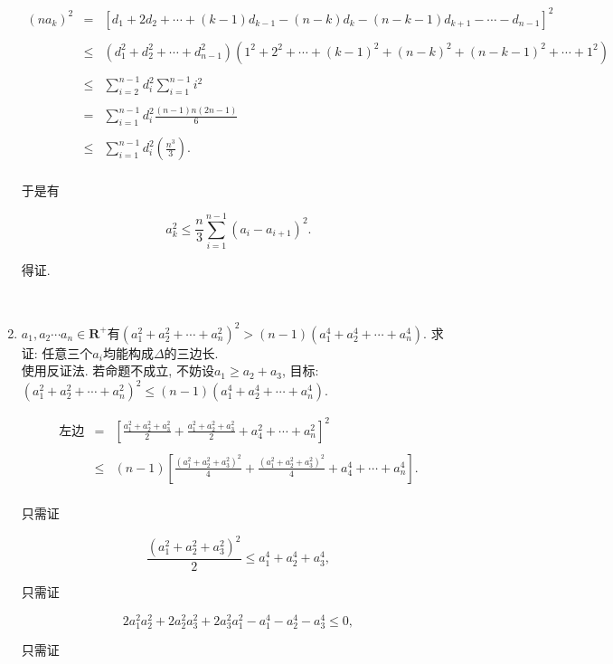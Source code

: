 \documentclass[8pt]{article}
\begin{document}
\begin{enumerate}
			$$
			\begin{array}{rcl}
				(n a_k)^2&=&\left[d_1+2d_2+\cdots+(k-1)d_{k-1}-(n-k)d_k-(n-k-1)d_{k+1}-\cdots-d_{n-1}\right]^2\\\\
				&\leq&\left(d_1^2+d_2^2+\cdots+d_{n-1}^2\right)\left(1^2+2^2+\cdots+(k-1)^2+(n-k)^2+(n-k-1)^2+\cdots+1^2\right)\\\\
				&\leq&\displaystyle \sum_{i=2}^{n-1}d_i^2 \sum_{i=1}^{n-1} i^2\\\\
				&=&\displaystyle \sum_{i=1}^{n-1}{d_i^2}\frac{(n-1)n(2n-1)}{6}\\\\
				&\leq&\displaystyle\sum_{i=1}^{n-1}{d_i^2}\left(\frac{n^3}{3}\right).\\
			\end{array}
			$$

			于是有

			$$a_k^2\leq\frac{n}{3}\sum_{i=1}^{n-1}\left(a_i-a_{i+1}\right)^2.$$

			得证.

		~\\

		\item $a_1, a_2 \cdots a_n \in \mathbf{R}^{+}$有$(a_1^2+a_2^2+\cdots+a_n^2)^2>(n-1)(a_1^4+a_2^4+\cdots+a_n^4).$ 求证: 任意三个$a_i$均能构成$\Delta$的三边长.
			~\\

			使用反证法. 若命题不成立, 不妨设$a_1\geq a_2+a_3$, 目标: $(a_1^2+a_2^2+\cdots+a_n^2)^2\leq(n-1)(a_1^4+a_2^4+\cdots+a_n^4).$

			$$
			\begin{array}{rcl}
				\text{左边}&=&\displaystyle \left[\frac{a_1^2+a_2^2+a_3^2}{2}+\frac{a_1^2+a_2^2+a_3^2}{2}+a_4^2+\cdots+a_n^2\right]^2\\\\
				&\leq&\displaystyle (n-1)\left[\frac{(a_1^2+a_2^2+a_3^2)^2}{4}+\frac{(a_1^2+a_2^2+a_3^2)^2}{4}+a_4^4+\cdots+a_n^4\right].\\
			\end{array}
			$$

			只需证

			$$\frac{(a_1^2+a_2^2+a_3^2)^2}{2}\leq a_1^4+a_2^4+a_3^4,$$

			只需证

			$$2a_1^2a_2^2+2a_2^2a_3^2+2a_3^2a_1^2-a_1^4-a_2^4-a_3^4\leq 0,$$

			只需证


\end{enumerate}
\end{document}
